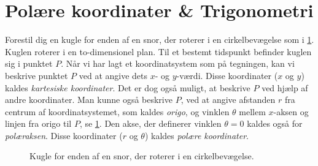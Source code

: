 \section{Polære koordinater \& Trigonometri} \label{mat:sec:trig}
Forestil dig en kugle for enden af en snor, der roterer i
en cirkelbevægelse som i \cref{mat:fig:pol_koor}. Kuglen roterer i en to-dimensionel plan. Til et bestemt tidspunkt befinder kuglen sig i punktet $P$. Når vi har lagt et koordinatsystem som på tegningen, kan vi beskrive punktet $P$ ved at angive dets $x$- og $y$-værdi. Disse koordinater ($x$ og $y$) kaldes \emph{kartesiske koordinater}. Det er dog også muligt, at beskrive $P$ ved hjælp af andre koordinater. Man kunne også beskrive $P$, ved at angive afstanden $r$ fra centrum af koordinatsystemet, som kaldes \textit{origo}, og vinklen $\theta$ mellem $x$-aksen og linjen fra origo til $P$, se \cref{mat:fig:pol_koor}. Den akse, der definerer vinklen $\theta = 0$ kaldes også for \emph{polæraksen}. Disse koordinater ($r$ og $\theta$) kaldes \emph{polære koordinater}.
%
\begin{figure}
    \centering
    \caption{Kugle for enden af en snor, der roterer i en cirkelbevægelse.}
    \label{mat:fig:pol_koor}
\end{figure}

